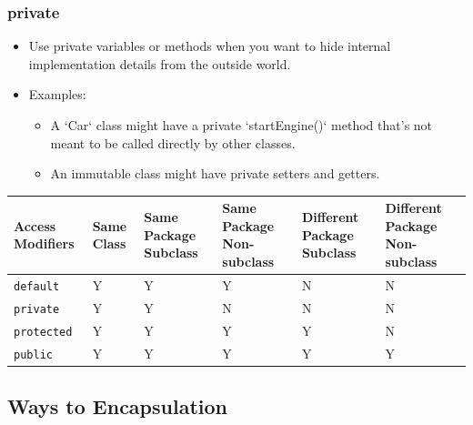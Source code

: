 \documentclass{book}
\begin{document}
\subsubsection{private}
\begin{itemize}
	\item Use private variables or methods when you want to hide internal implementation details from the outside world.
	\item Examples:
	      \begin{itemize}
		      \item A `Car` class might have a private `startEngine()` method that's not meant to be called directly by other classes.
		      \item An immutable class might have private setters and getters.
	      \end{itemize}
\end{itemize}

\begin{center}
	\begin{tabular}{|p{2cm}|p{2cm}|p{2cm}|p{2cm}|p{2cm}|p{2cm}|}
		\hline
		\textbf{Access Modifiers} & \textbf{Same Class} & \textbf{Same Package Subclass} & \textbf{Same Package Non-subclass} & \textbf{Different Package Subclass} & \textbf{Different Package Non-subclass} \\
		\hline
		\texttt{default}          & Y                   & Y                              & Y                                  & N                                   & N                                       \\
		\hline
		\texttt{private}          & Y                   & Y                              & N                                  & N                                   & N                                       \\
		\hline
		\texttt{protected}        & Y                   & Y                              & Y                                  & Y                                   & N                                       \\
		\hline
		\texttt{public}           & Y                   & Y                              & Y                                  & Y                                   & Y                                       \\
		\hline
	\end{tabular}
\end{center}

\subsection{Ways to Encapsulation}
\end{document}
